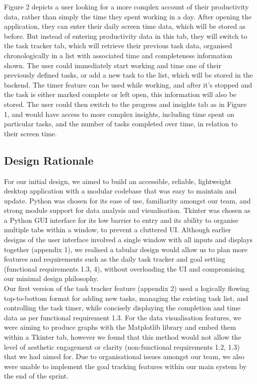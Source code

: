\documentclass[12pt,a4paper]{article}
\begin{document}
Figure 2 depicts a user looking for a more complex account of their productivity data, rather than simply the time they spent working in a day. After opening the application, they can enter their daily screen time data, which will be stored as before. But instead of entering productivity data in this tab, they will switch to the task tracker tab, which will retrieve their previous task data, organised chronologically in a list with associated time and completeness information shown. The user could immediately start working and time one of their previously defined tasks, or add a new task to the list, which will be stored in the backend. The timer feature can be used while working, and after it’s stopped and the task is either marked complete or left open, this information will also be stored. The user could then switch to the progress and insights tab as in Figure 1, and would have access to more complex insights, including time spent on particular tasks, and the number of tasks completed over time, in relation to their screen time. 
\\



\subsection{Design Rationale}



For our initial design, we aimed to build an accessible, reliable, lightweight desktop application with a modular codebase that was easy to maintain and update. Python was chosen for its ease of use, familiarity amongst our team, and strong module support for data analysis and visualisation. Tkinter was chosen as a Python GUI interface for its low barrier to entry and its ability to organise multiple tabs within a window, to prevent a cluttered UI. Although earlier designs of the user interface involved a single window with all inputs and displays together (appendix 1), we realised a tabular design would allow us to plan more features and requirements such as the daily task tracker and goal setting (functional requirements 1.3, 4), without overloading the UI and compromising our minimal design philosophy. \\

Our first version of the task tracker feature (appendix 2) used a logically flowing top-to-bottom format for adding new tasks, managing the existing task list, and controlling the task timer, while concisely displaying the completion and time data as per functional requirement 1.3. For the data visualisation features, we were aiming to produce graphs with the Matplotlib library and embed them within a Tkinter tab, however we found that this method would not allow the level of aesthetic engagement or clarity (non-functional requirements 1.2, 1.3) that we had aimed for. Due to organisational issues amongst our team, we also were unable to implement the goal tracking features within our main system by the end of the sprint. \\
\end{document}
